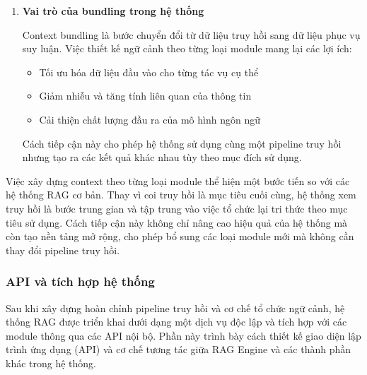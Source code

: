 \begin{enumerate}
    \item \textbf{Vai trò của bundling trong hệ thống}

    Context bundling là bước chuyển đổi từ dữ liệu truy hồi sang dữ liệu phục vụ suy luận. Việc thiết kế ngữ cảnh theo từng loại module mang lại các lợi ích:
    \begin{itemize}
        \item Tối ưu hóa dữ liệu đầu vào cho từng tác vụ cụ thể
        \item Giảm nhiễu và tăng tính liên quan của thông tin
        \item Cải thiện chất lượng đầu ra của mô hình ngôn ngữ
    \end{itemize}

    Cách tiếp cận này cho phép hệ thống sử dụng cùng một pipeline truy hồi nhưng tạo ra các kết quả khác nhau tùy theo mục đích sử dụng.

\end{enumerate}

Việc xây dựng context theo từng loại module thể hiện một bước tiến so với các hệ thống RAG cơ bản. Thay vì coi truy hồi là mục tiêu cuối cùng, hệ thống xem truy hồi là bước trung gian và tập trung vào việc tổ chức lại tri thức theo mục tiêu sử dụng. Cách tiếp cận này không chỉ nâng cao hiệu quả của hệ thống mà còn tạo nền tảng mở rộng, cho phép bổ sung các loại module mới mà không cần thay đổi pipeline truy hồi.

\subsubsection*{API và tích hợp hệ thống}

Sau khi xây dựng hoàn chỉnh pipeline truy hồi và cơ chế tổ chức ngữ cảnh, hệ thống RAG được triển khai dưới dạng một dịch vụ độc lập và tích hợp với các module thông qua các API nội bộ. Phần này trình bày cách thiết kế giao diện lập trình ứng dụng (API) và cơ chế tương tác giữa RAG Engine và các thành phần khác trong hệ thống.

